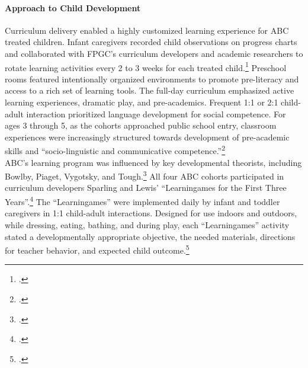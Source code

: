 \begin{appendices}
\paragraph{Approach to Child Development}
\noindent Curriculum delivery enabled a highly customized learning experience for ABC treated children. Infant caregivers recorded child observations on progress charts and collaborated with FPGC's curriculum developers and academic researchers to rotate learning activities every 2 to 3 weeks for each treated child.\footnote{\citet{Ramey_Collier_etal_1976_CarolinaAbecedarianProject,Campbell_Ramey_1994_CD}.} Preschool rooms featured intentionally organized environments to promote pre-literacy and access to a rich set of learning tools. The full-day curriculum emphasized active learning experiences, dramatic play, and pre-academics. Frequent 1:1 or 2:1 child-adult interaction prioritized language development for social competence. For ages 3 through 5, as the cohorts approached public school entry, classroom experiences were increasingly structured  towards development of pre-academic skills and ``socio-linguistic and communicative competence.''\footnote{\citet{Ramey-et-al_1977_Intro-to-ABC, Haskins_1985_CD, Ramey_1981_Modification, Ramey_Campbell_1979_SR, Ramey_Smith_1977_AJMD, Ramey_McGinness_etal_1982_Abecedarianapproach, Sparling_Lewis_1979_BOOKLearninggamesFirstThree,Sparling_Lewis_1984_BOOKLearningGamesThreesFours}.}\\

\noindent ABC's learning program was influenced by key developmental theorists, including Bowlby, Piaget, Vygotsky, and Tough.\footnote{\citet{Sparling_1974_Synth_Edu_Infant_SPEECH,Mcginness_1981_Developing,abc2014-2015interviews}.} All four ABC cohorts participated in curriculum developers Sparling and Lewis' ``Learningames for the First Three Years''.\footnote{ \citet{Sparling_Lewis_1979_BOOKLearninggamesFirstThree}.} The ``Learningames'' were implemented daily by infant and toddler caregivers in 1:1 child-adult interactions. Designed for use indoors and outdoors, while dressing, eating, bathing, and during play, each ``Learningames'' activity stated a developmentally appropriate objective, the needed materials, directions for teacher behavior, and expected child outcome.\footnote{\citet{Ramey_Campbell_1979_SR, Ramey_1981_Modification,Sparling_Lewis_1979_BOOKLearninggamesFirstThree}.}\\


\end{appendices}
